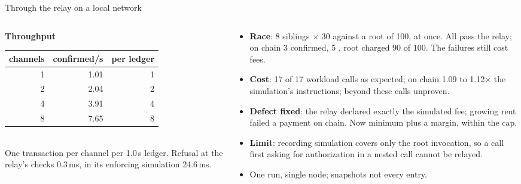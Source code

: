 \documentclass[aspectratio=169,11pt]{beamer}
\begin{document}
\begin{frame}{Through the relay on a local network}
  \footnotesize
  \begin{columns}[T]
    \begin{column}{0.4\linewidth}
      \textbf{Throughput}\\[2pt]
      \begin{tabular}{@{}rrr@{}}
        \toprule
        channels & confirmed/s & per ledger \\
        \midrule
        1 & 1.01 & 1 \\
        2 & 2.04 & 2 \\
        4 & 3.91 & 4 \\
        8 & 7.65 & 8 \\
        \bottomrule
      \end{tabular}\\[4pt]
      One transaction per channel per 1.0\,s ledger. Refusal at the relay's
      checks 0.3\,ms, in its enforcing simulation 24.6\,ms.
    \end{column}
    \begin{column}{0.58\linewidth}
      \begin{itemize}
        \item \textbf{Race}: 8 siblings $\times$ 30 against a root of 100, at
          once. All pass the relay; on chain 3 confirmed, 5
          , root charged 90 of 100.
          The failures still cost fees.
        \item \textbf{Cost}: 17 of 17 workload calls as
          expected; on chain 1.09 to 1.12$\times$
          the simulation's instructions; beyond these
          calls unproven.
        \item \textbf{Defect fixed}: the relay declared exactly the
          simulated fee; growing rent failed a payment on chain. Now minimum
          plus a margin, within the cap.
        \item \textbf{Limit}: recording simulation covers only the root
          invocation, so a call first asking for authorization in a nested
          call cannot be relayed.
        \item One run, single node; snapshots
          not every entry.
      \end{itemize}
    \end{column}
  \end{columns}
\end{frame}
\end{document}
